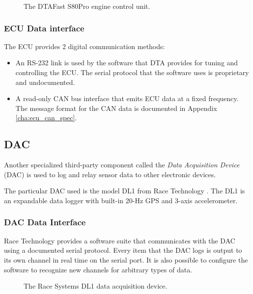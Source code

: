 \begin{figure}[H]
\centering
\caption{The DTAFast S80Pro engine control unit.}
\label{fig:s80pro_product}
\end{figure}

\subsubsection{ECU Data interface}
\label{sec:ecu_data} 

The ECU provides 2 digital communication methods:
\begin{itemize}
 \item An RS-232 link is used by the software that DTA provides for tuning and controlling the ECU. The serial protocol that the software uses is proprietary and undocumented.
 \item A read-only CAN bus interface that emits ECU data at a fixed frequency. The message format for the CAN data is documented in Appendix \ref{cha:ecu_can_spec}.
\end{itemize}
 


\subsection{DAC}

Another specialized third-party component called the \emph{Data Acquisition Device} (DAC) is used to log and relay sensor data to other electronic devices.

The particular DAC used is the model DL1 from Race Technology \cite{DL1Dsheet}. The DL1 is an expandable data logger with built-in 20-Hz GPS and 3-axis accelerometer.

\subsubsection{DAC Data Interface}

Race Technology provides a software suite that communicates with the DAC using a documented serial protocol. Every item that the DAC logs is output to its own channel in real time on the serial port. It is also possible to configure the software to recognize new channels for arbitrary types of data.

\begin{figure}[H]
\centering
\caption{The Race Systems DL1 data acquisition device.}
\label{fig:dl1_product}
\end{figure}


